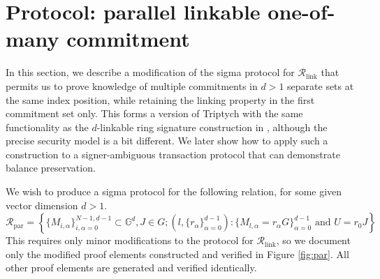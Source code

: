\documentclass{article}
\newcommand{\G}{\mathbb{G}}
\theoremstyle{definition}
\begin{document}
\section{Protocol: parallel linkable one-of-many commitment}
In this section, we describe a modification of the sigma protocol for $\mathcal{R}_{\text{link}}$ that permits us to prove knowledge of multiple commitments in $d > 1$ separate sets at the same index position, while retaining the linking property in the first commitment set only.
This forms a version of Triptych with the same functionality as the $d$-linkable ring signature construction in \cite{clsag}, although the precise security model is a bit different.
We later show how to apply such a construction to a signer-ambiguous transaction protocol that can demonstrate balance preservation.

We wish to produce a sigma protocol for the following relation, for some given vector dimension $d > 1$.
$$\mathcal{R}_{\text{par}} = \left\{ \{M_{i,\alpha}\}_{i,\alpha=0}^{N-1,d-1} \subset \G^d, J \in G ; \left(l, \{r_\alpha\}_{\alpha=0}^{d-1}\right) : \{M_{l,\alpha} = r_\alpha G\}_{\alpha=0}^{d-1} \text{ and } U = r_0 J \right\}$$
This requires only minor modifications to the protocol for $\mathcal{R}_{\text{link}}$, so we document only the modified proof elements constructed and verified in Figure \ref{fig:par}.
All other proof elements are generated and verified identically.
\end{document}
